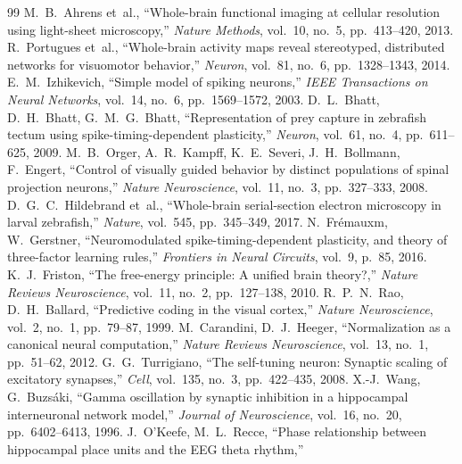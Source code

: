 \documentclass[11pt,a4paper]{article}
\begin{document}
\begin{thebibliography}{99}
  M.~B.~Ahrens et~al.,
  ``Whole-brain functional imaging at cellular resolution using light-sheet microscopy,''
  \textit{Nature Methods}, vol.~10, no.~5, pp.~413--420, 2013.
  R.~Portugues et~al.,
  ``Whole-brain activity maps reveal stereotyped, distributed networks for visuomotor behavior,''
  \textit{Neuron}, vol.~81, no.~6, pp.~1328--1343, 2014.
  E.~M.~Izhikevich,
  ``Simple model of spiking neurons,''
  \textit{IEEE Transactions on Neural Networks}, vol.~14, no.~6, pp.~1569--1572, 2003.
  D.~L.~Bhatt, D.~H.~Bhatt, G.~M.~G.~Bhatt,
  ``Representation of prey capture in zebrafish tectum using spike-timing-dependent plasticity,''
  \textit{Neuron}, vol.~61, no.~4, pp.~611--625, 2009.
  M.~B.~Orger, A.~R.~Kampff, K.~E.~Severi, J.~H.~Bollmann, F.~Engert,
  ``Control of visually guided behavior by distinct populations of spinal projection neurons,''
  \textit{Nature Neuroscience}, vol.~11, no.~3, pp.~327--333, 2008.
  D.~G.~C.~Hildebrand et~al.,
  ``Whole-brain serial-section electron microscopy in larval zebrafish,''
  \textit{Nature}, vol.~545, pp.~345--349, 2017.
  N.~Fr\'{e}mauxm, W.~Gerstner,
  ``Neuromodulated spike-timing-dependent plasticity, and theory of three-factor learning rules,''
  \textit{Frontiers in Neural Circuits}, vol.~9, p.~85, 2016.
  K.~J.~Friston,
  ``The free-energy principle: A unified brain theory?,''
  \textit{Nature Reviews Neuroscience}, vol.~11, no.~2, pp.~127--138, 2010.
  R.~P.~N.~Rao, D.~H.~Ballard,
  ``Predictive coding in the visual cortex,''
  \textit{Nature Neuroscience}, vol.~2, no.~1, pp.~79--87, 1999.
  M.~Carandini, D.~J.~Heeger,
  ``Normalization as a canonical neural computation,''
  \textit{Nature Reviews Neuroscience}, vol.~13, no.~1, pp.~51--62, 2012.
  G.~G.~Turrigiano,
  ``The self-tuning neuron: Synaptic scaling of excitatory synapses,''
  \textit{Cell}, vol.~135, no.~3, pp.~422--435, 2008.
  X.-J.~Wang, G.~Buzs\'{a}ki,
  ``Gamma oscillation by synaptic inhibition in a hippocampal interneuronal network model,''
  \textit{Journal of Neuroscience}, vol.~16, no.~20, pp.~6402--6413, 1996.
  J.~O'Keefe, M.~L.~Recce,
  ``Phase relationship between hippocampal place units and the EEG theta rhythm,''

\end{thebibliography}
\end{document}
